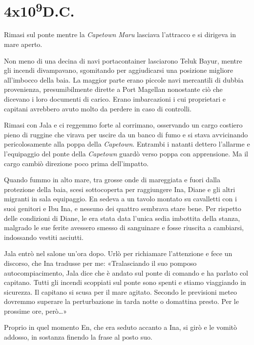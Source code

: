 \chapter{4x10\textsuperscript{9}D.C.}\label{4x10^9-7}

\hfill\break

Rimasi sul ponte mentre la \emph{Capetown Maru} lasciava l'attracco e si
dirigeva in mare aperto.

Non meno di una decina di navi portacontainer lasciarono Teluk Bayur,
mentre gli incendi divampavano, sgomitando per aggiudicarsi una
posizione migliore all'imbocco della baia. La maggior parte erano
piccole navi mercantili di dubbia provenienza, presumibilmente dirette a
Port Magellan nonostante ciò che dicevano i loro documenti di carico.
Erano imbarcazioni i cui proprietari e capitani avrebbero avuto molto da
perdere in caso di controlli.

Rimasi con Jala e ci reggemmo forte al corrimano, osservando un cargo
costiero pieno di ruggine che virava per uscire da un banco di fumo e si
stava avvicinando pericolosamente alla poppa della \emph{Capetown}.
Entrambi i natanti dettero l'allarme e l'equipaggio del ponte della
\emph{Capetown} guardò verso poppa con apprensione. Ma il cargo cambiò
direzione poco prima dell'impatto.

Quando fummo in alto mare, tra grosse onde di mareggiata e fuori dalla
protezione della baia, scesi sottocoperta per raggiungere Ina, Diane e
gli altri migranti in sala equipaggio. En sedeva a un tavolo montato su
cavalletti con i suoi genitori e Ibu Ina, e nessuno dei quattro sembrava
stare bene. Per rispetto delle condizioni di Diane, le era stata data
l'unica sedia imbottita della stanza, malgrado le sue ferite avessero
smesso di sanguinare e fosse riuscita a cambiarsi, indossando vestiti
asciutti.

Jala entrò nel salone un'ora dopo. Urlò per richiamare l'attenzione e
fece un discorso, che Ina tradusse per me: «Tralasciando il suo pomposo
autocompiacimento, Jala dice che è andato sul ponte di comando e ha
parlato col capitano. Tutti gli incendi scoppiati sul ponte sono spenti
e stiamo viaggiando in sicurezza. Il capitano si scusa per il mare
agitato. Secondo le previsioni meteo dovremmo superare la perturbazione
in tarda notte o domattina presto. Per le prossime ore, però\ldots»

Proprio in quel momento En, che era seduto accanto a Ina, si girò e le
vomitò addosso, in sostanza finendo la frase al posto suo.

